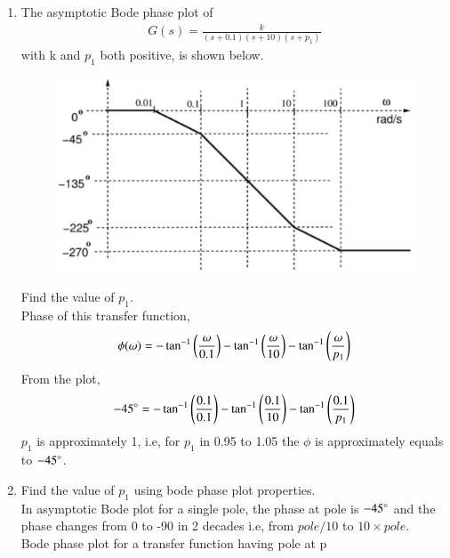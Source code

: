 \begin{enumerate}[label=\thesubsection.\arabic*.,ref=\thesubsection.\theenumi]


\item The asymptotic Bode phase plot of 
%
\begin{align}
\label{eq:ee18btech11037_gs}
G(s) = \frac{k}{(s+0.1)(s+10)(s+{p_1})}
\end{align}
%
with k and $p_1$ both positive, is shown below.
\begin{figure}[!ht]
\centering
\includegraphics[width=\columnwidth]{figs/ee18btech11037/ee18btech11037.eps}
\caption{}
\label{fig:ee18btech11037}
\end{figure}
Find the value of \textit{$p_1$}.
\\
\solution
Phase of this transfer function,
\begin{align}
\phi(\omega) = -\tan^{-1} \left(\frac{\omega}{0.1}\right)-\tan^{-1} \left(\frac{\omega}{10}\right)-\tan^{-1} \left(\frac{\omega}{p_1}\right)
\end{align}
From the plot,
\begin{align}
-45\degree = -\tan^{-1}\left(\frac{0.1}{0.1}\right) -\tan^{-1}\left(\frac{0.1}{10}\right) -\tan^{-1}\left(\frac{0.1}{p_1}\right)
\end{align}
 $p_1$ is approximately 1, i.e, for $p_1$ in 0.95 to 1.05 the $\phi$ is approximately equals to $-45\degree$.
%
\item Find the value of $p_1$ using bode phase plot properties.
\\
\solution In asymptotic Bode plot for a single pole, the phase at pole is $-45\degree$ and the phase changes from 0 to -90 in 2 decades i.e, from $pole/10$ to $10\times pole$.
\\
Bode phase plot for a transfer function having pole at p
\begin{align}

\end{align}
\end{enumerate}
